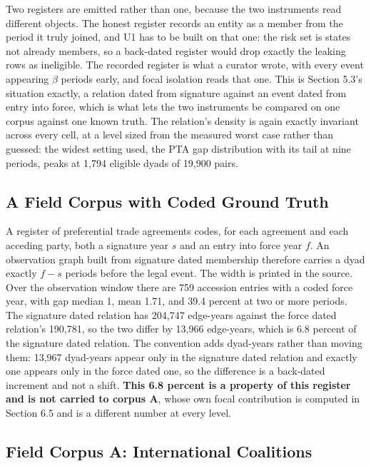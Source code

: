 \documentclass[twoside,11pt]{article}
\begin{document}
Two registers are emitted rather than one, because the two instruments read different objects. The honest register records an entity as a member from the period it truly joined, and U1 has to be built on that one: the risk set is states not already members, so a back-dated register would drop exactly the leaking rows as ineligible. The recorded register is what a curator wrote, with every event appearing \(\beta\) periods early, and focal isolation reads that one. This is Section 5.3's situation exactly, a relation dated from signature against an event dated from entry into force, which is what lets the two instruments be compared on one corpus against one known truth. The relation's density is again exactly invariant across every cell, at a level sized from the measured worst case rather than guessed: the widest setting used, the PTA gap distribution with its tail at nine periods, peaks at 1,794 eligible dyads of 19,900 pairs.

\subsection{A Field Corpus with Coded Ground Truth}

A register of preferential trade agreements \citep{desta} codes, for each agreement and each acceding party, both a signature year \(s\) and an entry into force year \(f\). An observation graph built from signature dated membership therefore carries a dyad exactly \(f - s\) periods before the legal event. The width is printed in the source. Over the observation window there are 759 accession entries with a coded force year, with gap median 1, mean 1.71, and 39.4 percent at two or more periods. The signature dated relation has 204,747 edge-years against the force dated relation's 190,781, so the two differ by 13,966 edge-years, which is 6.8 percent of the signature dated relation. The convention adds dyad-years rather than moving them: 13,967 dyad-years appear only in the signature dated relation and exactly one appears only in the force dated one, so the difference is a back-dated increment and not a shift. \textbf{This 6.8 percent is a property of this register and is not carried to corpus A}, whose own focal contribution is computed in Section 6.5 and is a different number at every level.

\subsection{Field Corpus A: International Coalitions}
\end{document}
